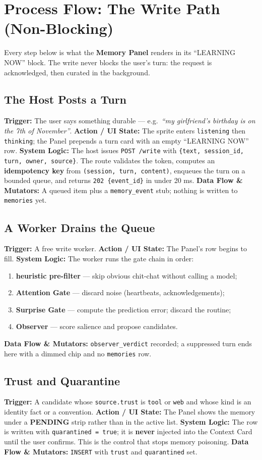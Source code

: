 \chapter{Process Flow: The Write Path (Non-Blocking)}
Every step below is what the \textbf{Memory Panel} renders in its ``LEARNING NOW'' block. The write
never blocks the user's turn: the request is acknowledged, then curated in the background.

\section{The Host Posts a Turn}
\textbf{Trigger:} The user says something durable --- e.g.\ \emph{``my girlfriend's birthday is on the
7th of November''}.
\textbf{Action / UI State:} The sprite enters \texttt{listening} then \texttt{thinking}; the Panel
prepends a turn card with an empty ``LEARNING NOW'' row.
\textbf{System Logic:} The host issues \texttt{POST /write} with
\texttt{\{text, session\_id, turn, owner, source\}}. The route validates the token, computes an
\textbf{idempotency key} from \texttt{(session, turn, content)}, enqueues the turn on a bounded queue,
and returns \texttt{202 \{event\_id\}} in under 20 ms.
\textbf{Data Flow \& Mutators:} A queued item plus a \texttt{memory\_event} stub; nothing is written to
\texttt{memories} yet.

\section{A Worker Drains the Queue}
\textbf{Trigger:} A free write worker.
\textbf{Action / UI State:} The Panel's row begins to fill.
\textbf{System Logic:} The worker runs the gate chain in order:
\begin{enumerate}
  \item \textbf{heuristic pre-filter} --- skip obvious chit-chat without calling a model;
  \item \textbf{Attention Gate} --- discard noise (heartbeats, acknowledgements);
  \item \textbf{Surprise Gate} --- compute the prediction error; discard the routine;
  \item \textbf{Observer} --- score salience and propose candidates.
\end{enumerate}
\textbf{Data Flow \& Mutators:} \texttt{observer\_verdict} recorded; a suppressed turn ends here with a
dimmed chip and no \texttt{memories} row.

\section{Trust and Quarantine}
\textbf{Trigger:} A candidate whose \texttt{source.trust} is \texttt{tool} or \texttt{web} and whose
kind is an identity fact or a convention.
\textbf{Action / UI State:} The Panel shows the memory under a \textbf{PENDING} strip rather than in the
active list.
\textbf{System Logic:} The row is written with \texttt{quarantined = true}; it is \textbf{never}
injected into the Context Card until the user confirms. This is the control that stops memory poisoning.
\textbf{Data Flow \& Mutators:} \texttt{INSERT} with \texttt{trust} and \texttt{quarantined} set.

